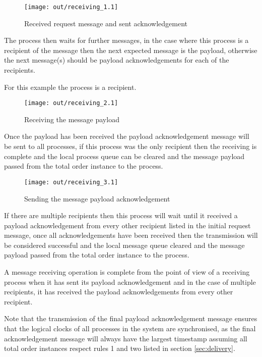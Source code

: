 \documentclass[twocolumn]{article}
\begin{document}
\begin{figure}[h!]
  \centering
  \texttt{[image: out/receiving\_1.1]}
  \caption{Received request message and sent acknowledgement}
  \label{fig:receiving_1}
\end{figure}
\FloatBarrier

The process then waits for further messages, in the case where this process is a
recipient of the message then the next expected message is the payload,
otherwise the next message(s) should be payload acknowledgements for each of the
recipients.

For this example the process is a recipient.

\begin{figure}[h!]
  \centering
  \texttt{[image: out/receiving\_2.1]}
  \caption{Receiving the message payload}
  \label{fig:receiving_2}
\end{figure}
\FloatBarrier

Once the payload has been received the payload acknowledgement message will be
sent to all processes, if this process was the only recipient then the receiving
is complete and the local process queue can be cleared and the message payload
passed from the total order instance to the process.

\begin{figure}[h!]
  \centering
  \texttt{[image: out/receiving\_3.1]}
  \caption{Sending the message payload acknowledgement}
  \label{fig:receiving_3}
\end{figure}
\FloatBarrier

If there are multiple recipients then this process will wait until it received
a payload acknowledgement from every other recipient listed in the initial
request message, once all acknowledgements have been received then the
transmission will be considered successful and the local message queue cleared
and the message payload passed from the total order instance to the process.

A message receiving operation is complete from the point of view of a receiving
process when it has sent its payload acknowledgement and in the case of multiple
recipients, it has received the payload acknowledgements from every other
recipient.

Note that the transmission of the final payload acknowledgement message ensures
that the logical clocks of all processes in the system are synchronised, as the
final acknowledgement message will always have the largest timestamp assuming
all total order instances respect rules 1 and two listed in section
\ref{sec:delivery}.
\end{document}

